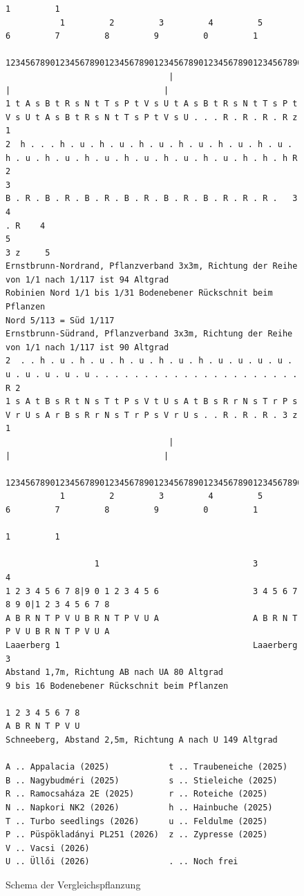 \documentclass[twocolumn]{scrartcl}
\begin{document}
\begin{figure}[htbp]
\begin{Verbatim}[fontsize=\footnotesize]
                                                                                                     1         1
           1         2         3         4         5         6         7         8         9         0         1
  123456789012345678901234567890123456789012345678901234567890123456789012345678901234567890123456789012345678901234567
                                 |                               |                               |
1 t A s B t R s N t T s P t V s U t A s B t R s N t T s P t V s U t A s B t R s N t T s P t V s U . . . R . R . R . R z 1
2  h . . . h . u . h . u . h . u . h . u . h . u . h . u . h . u . h . u . h . u . h . u . h . u . h . u . h . h . h R  2
3                                                             B . R . B . R . B . R . B . R . B . R . B . R . R . R .   3
4                                                                                                                . R    4
5                                                                                                               3 z     5
Ernstbrunn-Nordrand, Pflanzverband 3x3m, Richtung der Reihe von 1/1 nach 1/117 ist 94 Altgrad
Robinien Nord 1/1 bis 1/31 Bodenebener Rückschnit beim Pflanzen
Nord 5/113 = Süd 1/117
Ernstbrunn-Südrand, Pflanzverband 3x3m, Richtung der Reihe von 1/1 nach 1/117 ist 90 Altgrad
2  . . h . u . h . u . h . u . h . u . h . u . u . u . u . u . u . u . u . u . . . . . . . . . . . . . . . . . . . . . R 2
1 s A t B s R t N s T t P s V t U s A t B s R r N s T r P s V r U s A r B s R r N s T r P s V r U s . . R . R . R . 3 z  1
                                 |                               |                               |
  1234567890123456789012345678901234567890123456789012345678901234567890123456789012345678901234567890123456789012345678
           1         2         3         4         5         6         7         8         9         0         1
                                                                                                     1         1

                  1                               3             4
1 2 3 4 5 6 7 8|9 0 1 2 3 4 5 6                   3 4 5 6 7 8 9 0|1 2 3 4 5 6 7 8
A B R N T P V U B R N T P V U A                   A B R N T P V U B R N T P V U A
Laaerberg 1                                       Laaerberg 3
Abstand 1,7m, Richtung AB nach UA 80 Altgrad
9 bis 16 Bodenebener Rückschnit beim Pflanzen

1 2 3 4 5 6 7 8
A B R N T P V U
Schneeberg, Abstand 2,5m, Richtung A nach U 149 Altgrad

A .. Appalacia (2025)            t .. Traubeneiche (2025)
B .. Nagybudméri (2025)          s .. Stieleiche (2025)
R .. Ramocsaháza 2E (2025)       r .. Roteiche (2025)
N .. Napkori NK2 (2026)          h .. Hainbuche (2025)
T .. Turbo seedlings (2026)      u .. Feldulme (2025)
P .. Püspökladányi PL251 (2026)  z .. Zypresse (2025)
V .. Vacsi (2026)
U .. Üllői (2026)                . .. Noch frei
\end{Verbatim}
\caption{Schema der Vergleichspflanzung}
\label{fig:versuchsflaeche}
\end{figure}
\end{document}
